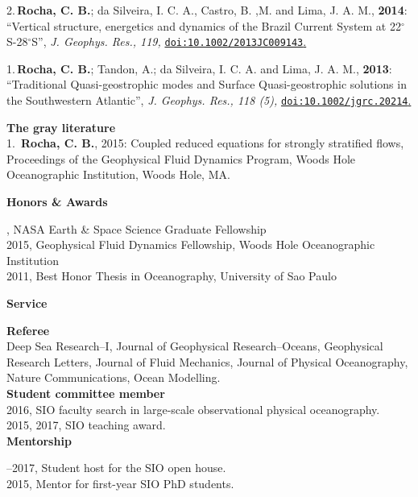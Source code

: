\documentclass[a4paper,11pt,final]{memoir}
\newcommand{\Sep}{\vspace{1.25em}}
\newcommand{\SmallSep}{\vspace{0.5em}}
\newcommand{\CVSection}[1]
    {\Large\textbf{#1}\par
    \SmallSep\normalsize\normalfont}
\newcommand{\CVItem}[1]
    {\textbf{\color{NavyBlue} #1}}
\begin{document}
\SmallSep

2.\,\textbf{Rocha, C. B.};  da Silveira, I. C. A., Castro, B. ,M. and Lima, J. A. M., \textbf{2014}: ``Vertical structure, energetics and dynamics of the Brazil Current System at 22$^\circ$S-28$^\circ$S'', \textit{ J. Geophys. Res., 119,} \href{http://onlinelibrary.wiley.com/doi/10.1002/2013JC009143/abstract}{\texttt{doi:10.1002/2013JC009143}.}

\SmallSep

1.\,\textbf{Rocha, C. B.}; Tandon, A.; da Silveira, I. C. A. and Lima, J. A. M., \textbf{2013}: ``Traditional Quasi-geostrophic modes and Surface Quasi-geostrophic solutions in the Southwestern Atlantic'', \textit{ J. Geophys. Res., 118 (5),} \href{http://dx.doi.org/10.1002/jgrc.20214}{\texttt{doi:10.1002/jgrc.20214}.}

\SmallSep

\clearpage
\framebreak
\framebreak


\CVItem{The gray literature}\\

1.\, \textbf{Rocha, C. B.}, 2015: Coupled reduced equations for strongly stratified flows,  Proceedings of the Geophysical Fluid Dynamics Program,  Woods Hole Oceanographic Institution, Woods Hole, MA.

\Sep

\CVSection{Honors \& Awards}
2016, NASA Earth \& Space Science Graduate Fellowship\\
2015, Geophysical Fluid Dynamics Fellowship, Woods Hole Oceanographic Institution\\
2011, Best Honor Thesis in Oceanography, University of Sao Paulo

\Sep

\CVSection{Service}

\CVItem{Referee}\\
Deep Sea Research--I, Journal of Geophysical Research--Oceans,
           Geophysical Research Letters, Journal of
           Fluid Mechanics, Journal of Physical Oceanography, Nature Communications, Ocean Modelling. \\

\CVItem{Student committee member}\\
2016, SIO faculty search in large-scale observational physical oceanography.\\
2015, 2017,  SIO teaching award.\\

\CVSection{Mentorship}
2015--2017, Student host for the SIO open house.\\
2015,  Mentor for first-year SIO PhD students.
\end{document}
